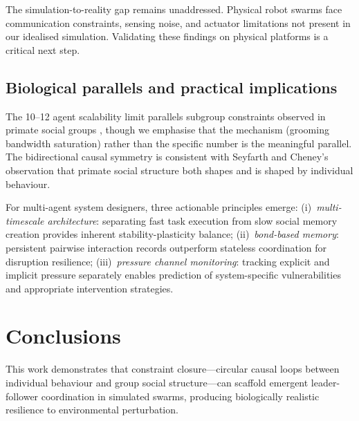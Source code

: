 \documentclass[12pt]{article}
\begin{document}
The simulation-to-reality gap remains unaddressed. Physical robot swarms face communication constraints, sensing noise, and actuator limitations not present in our idealised simulation. Validating these findings on physical platforms is a critical next step.


\subsection{Biological parallels and practical implications}
\label{sec:disc_bio}

The 10--12 agent scalability limit parallels subgroup constraints observed in primate social groups \cite{dunbar1992}, though we emphasise that the mechanism (grooming bandwidth saturation) rather than the specific number is the meaningful parallel. The bidirectional causal symmetry is consistent with Seyfarth and Cheney's \cite{seyfarth2012} observation that primate social structure both shapes and is shaped by individual behaviour.

For multi-agent system designers, three actionable principles emerge: (i)~\emph{multi-timescale architecture}: separating fast task execution from slow social memory creation provides inherent stability-plasticity balance; (ii)~\emph{bond-based memory}: persistent pairwise interaction records outperform stateless coordination for disruption resilience; (iii)~\emph{pressure channel monitoring}: tracking explicit and implicit pressure separately enables prediction of system-specific vulnerabilities and appropriate intervention strategies.


\section{Conclusions}
\label{sec:conclusions}

This work demonstrates that constraint closure---circular causal loops between individual behaviour and group social structure---can scaffold emergent leader-follower coordination in simulated swarms, producing biologically realistic resilience to environmental perturbation.
\end{document}
